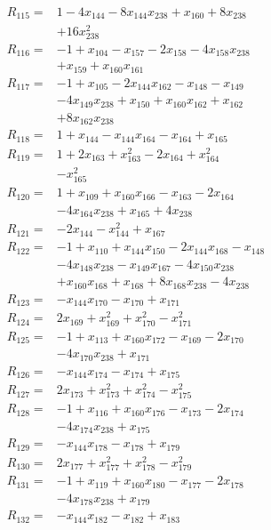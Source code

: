 \begin{align*}
R_{115}={}&1 -4x_{144} -8x_{144}x_{238} +x_{160} +8x_{238}\\
&+16x_{238}^{2}\\[3pt]
R_{116}={}&-1 +x_{104} -x_{157} -2x_{158} -4x_{158}x_{238}\\
&+x_{159} +x_{160}x_{161}\\[3pt]
R_{117}={}&-1 +x_{105} -2x_{144}x_{162} -x_{148} -x_{149}\\
&-4x_{149}x_{238} +x_{150} +x_{160}x_{162} +x_{162}\\
&+8x_{162}x_{238}\\[3pt]
R_{118}={}&1 +x_{144} -x_{144}x_{164} -x_{164} +x_{165}\\[3pt]
R_{119}={}&1 +2x_{163} +x_{163}^{2} -2x_{164} +x_{164}^{2}\\
&-x_{165}^{2}\\[3pt]
R_{120}={}&1 +x_{109} +x_{160}x_{166} -x_{163} -2x_{164}\\
&-4x_{164}x_{238} +x_{165} +4x_{238}\\[3pt]
R_{121}={}&-2x_{144} -x_{144}^{2} +x_{167}\\[3pt]
R_{122}={}&-1 +x_{110} +x_{144}x_{150} -2x_{144}x_{168} -x_{148}\\
&-4x_{148}x_{238} -x_{149}x_{167} -4x_{150}x_{238}\\
&+x_{160}x_{168} +x_{168} +8x_{168}x_{238} -4x_{238}\\[3pt]
R_{123}={}&-x_{144}x_{170} -x_{170} +x_{171}\\[3pt]
R_{124}={}&2x_{169} +x_{169}^{2} +x_{170}^{2} -x_{171}^{2}\\[3pt]
R_{125}={}&-1 +x_{113} +x_{160}x_{172} -x_{169} -2x_{170}\\
&-4x_{170}x_{238} +x_{171}\\[3pt]
R_{126}={}&-x_{144}x_{174} -x_{174} +x_{175}\\[3pt]
R_{127}={}&2x_{173} +x_{173}^{2} +x_{174}^{2} -x_{175}^{2}\\[3pt]
R_{128}={}&-1 +x_{116} +x_{160}x_{176} -x_{173} -2x_{174}\\
&-4x_{174}x_{238} +x_{175}\\[3pt]
R_{129}={}&-x_{144}x_{178} -x_{178} +x_{179}\\[3pt]
R_{130}={}&2x_{177} +x_{177}^{2} +x_{178}^{2} -x_{179}^{2}\\[3pt]
R_{131}={}&-1 +x_{119} +x_{160}x_{180} -x_{177} -2x_{178}\\
&-4x_{178}x_{238} +x_{179}\\[3pt]
R_{132}={}&-x_{144}x_{182} -x_{182} +x_{183}\\[3pt]

\end{align*}
